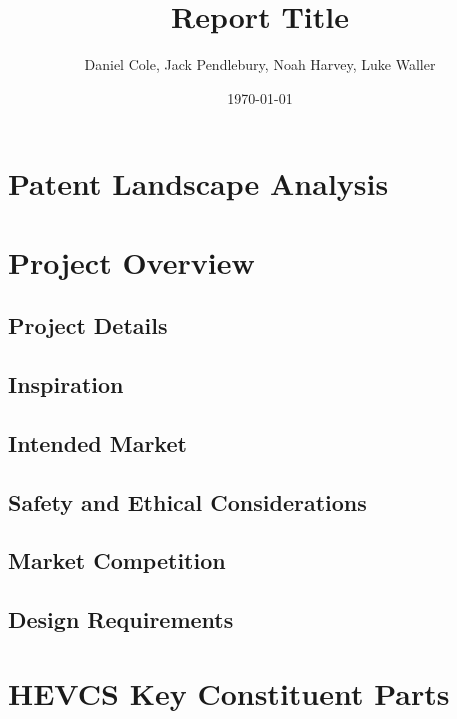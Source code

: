 \documentclass [12pt]{article}
\begin{document}
\title{\bf Report Title}
\author{Daniel Cole, Jack Pendlebury, Noah Harvey, Luke Waller}
\date{\today}
\maketitle
\thispagestyle{empty}

\newpage
{}
\setcounter{page}{1}
\tableofcontents
\newpage

\listoffigures
\listoftables

\newpage
\section{Patent Landscape Analysis}\label{sec:PLA}

\section{Project Overview}\label{sec:project_overview}
\subsection{Project Details}\label{sec:project_details}
\subsection{Inspiration}\label{sec:inspiration}
\subsection{Intended Market}\label{sec:intended_market}
\subsection{Safety and Ethical Considerations}\label{sec:SAEC}
\subsection{Market Competition}\label{sec:market_competition}
\subsection{Design Requirements}\label{sec:design_requirements}

\section{HEVCS Key Constituent Parts}\label{sec:constituent_parts}
\end{document}
